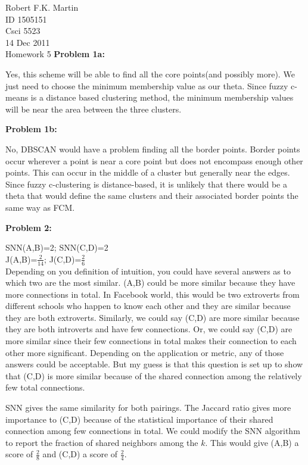 \documentclass[11pt]{article}
\numberwithin{equation}{section}  %
\begin{document}


\noindent Robert F.K. Martin\\
ID 1505151\\
Csci 5523\\
14 Dec 2011\\
Homework 5
\hline
\vspace*{0.25in}
\noindent\textbf{Problem 1a: }

Yes, this scheme will be able to find all the core points(and possibly more). We just need to choose the minimum membership value as our theta. Since fuzzy c-means is a distance based clustering method, the minimum membership values will be near the area between the three clusters.
\vspace*{0.25in}

\noindent\textbf{Problem 1b: }

No, DBSCAN would have a problem finding all the border points. Border points occur wherever a point is near a core point but does not encompass enough other points. This can occur in the middle of a cluster but generally near the edges. Since fuzzy c-clustering is distance-based, it is unlikely that there would be a theta that would define the same clusters and their associated border points the same way as FCM.
\vspace*{0.25in}

\noindent\textbf{Problem 2: }

SNN(A,B)=2; SNN(C,D)=2\\
J(A,B)=$\frac{2}{14}$; J(C,D)=$\frac{2}{6}$ \\
Depending on you definition of intuition, you could have several answers as to which two are the most similar. (A,B) could be more similar because they have more connections in total. In Facebook world, this would be two extroverts from different schools who happen to know each other and they are similar because they are both extroverts. Similarly, we could say (C,D) are more similar because they are both introverts and have few connections. Or, we could say (C,D) are more similar since their few connections in total makes their connection to each other more significant. Depending on the application or metric, any of those answers could be acceptable. But my guess is that this question is set up to show that (C,D) is more similar because of the shared connection among the relatively few total connections.

SNN gives the same similarity for both pairings. The Jaccard ratio gives more importance to (C,D) because of the statistical importance of their shared connection among few connections in total. We could modify the SNN algorithm to report the fraction of shared neighbors among the $k$. This would give (A,B) a score of $\frac{2}{8}$ and (C,D) a score of $\frac{2}{4}$.
\vspace*{0.25in}
\end{document}
